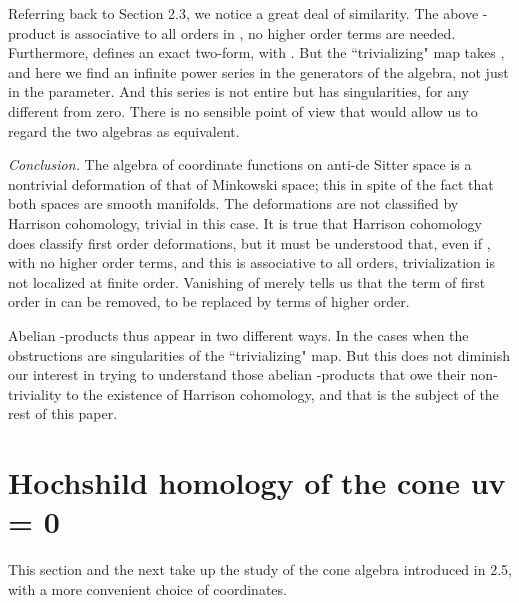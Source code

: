 \documentclass[a4paper,a4paper]{article}
\begin{document}
Referring back to  Section 2.3, we notice a great deal of similarity. The
above \myHighlight{$*$}\coordHE{}-product is associative to all orders in \myHighlight{$\rho$}\coordHE{}, no higher order
terms are needed. Furthermore, \coordHE{}  defines an
exact two-form, \coordHE{} with \coordHE{}. But the
``trivializing" map takes \coordHE{}, and
here we find an infinite power series in the generators of the algebra, not
just in the parameter. And this series is not entire but has singularities,
for any \myHighlight{$\rho$}\coordHE{} different from zero. There is no sensible point of view 
that would allow us to regard the two algebras as equivalent.
\bigskip

\noindent\textit{Conclusion.}  The algebra of coordinate functions on 
anti-de Sitter space is a nontrivial deformation of that of Minkowski space; 
this in spite of the fact that both spaces are smooth manifolds. 
The deformations are not classified by Harrison cohomology, trivial in 
this case. It is true that Harrison cohomology does classify first order 
deformations, but it must be understood that, even if 
\coordHE{}, with no higher order terms, and this is 
associative to all orders, trivialization is not localized at finite order. 
Vanishing of \coordHE{} merely tells us that the term of first order 
in \myHighlight{$\lambda$}\coordHE{} can be removed, to be replaced by terms of higher order.

Abelian \myHighlight{$*$}\coordHE{}-products thus appear in two different ways. In the cases
when \coordHE{} the obstructions are singularities of the
``trivializing" map. But this does not diminish our interest in trying to
understand those abelian \myHighlight{$*$}\coordHE{}-products that owe their non-triviality to
the existence of Harrison cohomology, and that is the subject of the rest
of this paper.

\section{Hochshild homology of the cone  uv = 0} %


This section and the next take up the study of the cone algebra introduced
in 2.5, with a more convenient choice of coordinates. 
\end{document}
